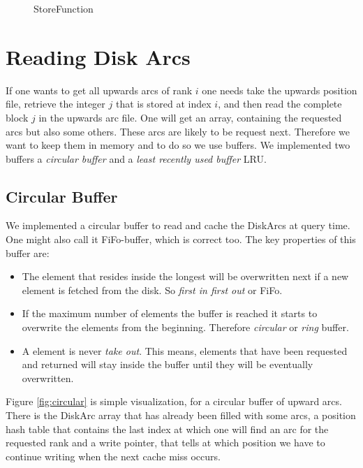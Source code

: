 \begin{figure}
    \centering
    
    \caption{StoreFunction}
    \label{fig:store_function}
\end{figure}

\section{Reading Disk Arcs}

If one wants to get all upwards arcs of rank $i$ one needs take  the upwards position file, retrieve the integer $j$ that is stored at index $i$, and then read the complete block $j$ in the upwards arc file.
One will get an array, containing the requested arcs but also some others.
These arcs are likely to be request next.
Therefore we want to keep them in memory and to do so we use buffers. 
We implemented two buffers a \textit{circular buffer} and a \textit{least recently used buffer} LRU.

\subsection{Circular Buffer}

We implemented a circular buffer to read and cache the DiskArcs at query time.
One might also call it FiFo-buffer, which is correct too. 
The key properties of this buffer are:

\begin{itemize}
    \item The element that resides inside the longest will be overwritten next if a new element is fetched from the disk. So \textit{first in first out} or FiFo.
    \item If the maximum number of elements the buffer is reached it starts to overwrite the elements from the beginning. Therefore \textit{circular} or \textit{ring} buffer.
    \item A element is never \textit{take out}. This means, elements that have been requested and returned will stay inside the buffer until they will be eventually overwritten. 
\end{itemize}
Figure \ref{fig:circular} is simple visualization, for a circular buffer of upward arcs.
There is the DiskArc array that has already been filled with some arcs, a position hash table that contains the last index at which one will find an arc for the requested rank and a write pointer, that tells at which position we have to continue writing when the next cache miss occurs.

